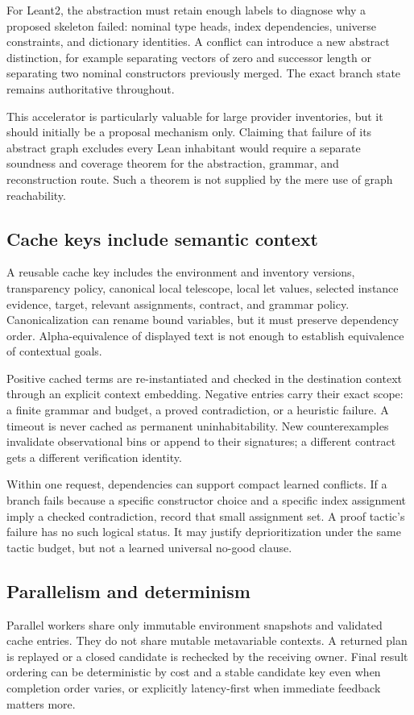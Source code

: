 For Leant2, the abstraction must retain enough labels to diagnose why a proposed skeleton failed: nominal type heads, index dependencies, universe constraints, and dictionary identities. A conflict can introduce a new abstract distinction, for example separating vectors of zero and successor length or separating two nominal constructors previously merged. The exact branch state remains authoritative throughout.

This accelerator is particularly valuable for large provider inventories, but it should initially be a proposal mechanism only. Claiming that failure of its abstract graph excludes every Lean inhabitant would require a separate soundness and coverage theorem for the abstraction, grammar, and reconstruction route. Such a theorem is not supplied by the mere use of graph reachability.

\subsection{Cache keys include semantic context}
A reusable cache key includes the environment and inventory versions, transparency policy, canonical local telescope, local let values, selected instance evidence, target, relevant assignments, contract, and grammar policy. Canonicalization can rename bound variables, but it must preserve dependency order. Alpha-equivalence of displayed text is not enough to establish equivalence of contextual goals.

Positive cached terms are re-instantiated and checked in the destination context through an explicit context embedding. Negative entries carry their exact scope: a finite grammar and budget, a proved contradiction, or a heuristic failure. A timeout is never cached as permanent uninhabitability. New counterexamples invalidate observational bins or append to their signatures; a different contract gets a different verification identity.

Within one request, dependencies can support compact learned conflicts. If a branch fails because a specific constructor choice and a specific index assignment imply a checked contradiction, record that small assignment set. A proof tactic's failure has no such logical status. It may justify deprioritization under the same tactic budget, but not a learned universal no-good clause.

\subsection{Parallelism and determinism}
Parallel workers share only immutable environment snapshots and validated cache entries. They do not share mutable metavariable contexts. A returned plan is replayed or a closed candidate is rechecked by the receiving owner. Final result ordering can be deterministic by cost and a stable candidate key even when completion order varies, or explicitly latency-first when immediate feedback matters more.

